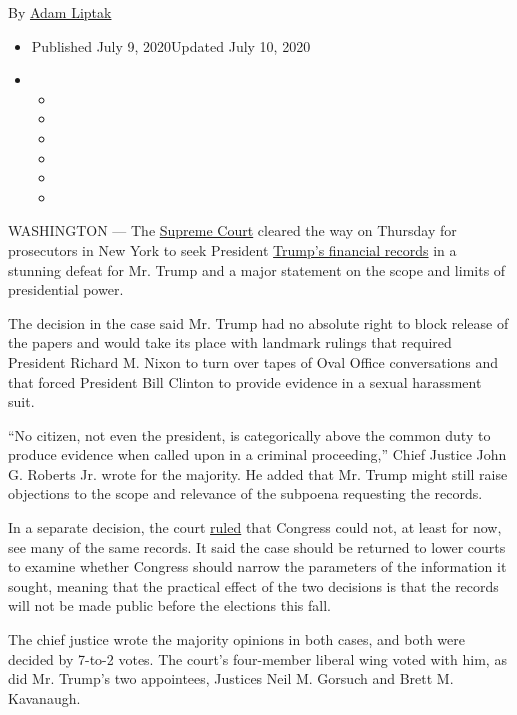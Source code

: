 By \href{https://www.nytimes3xbfgragh.onion/by/adam-liptak}{Adam Liptak}

\begin{itemize}
\item
  Published July 9, 2020Updated July 10, 2020
\item
  \begin{itemize}
  \item
  \item
  \item
  \item
  \item
  \item
  \end{itemize}
\end{itemize}

WASHINGTON --- The
\href{https://www.nytimes3xbfgragh.onion/2020/07/10/podcasts/the-daily/supreme-court-trump-taxes.html?action=click\&module=Briefings\&pgtype=Homepage}{Supreme
Court} cleared the way on Thursday for prosecutors in New York to seek
President
\href{https://www.nytimes3xbfgragh.onion/2020/07/10/nyregion/donald-trump-taxes-cy-vance.html}{Trump's
financial records} in a stunning defeat for Mr. Trump and a major
statement on the scope and limits of presidential power.

The decision in the case said Mr. Trump had no absolute right to block
release of the papers and would take its place with landmark rulings
that required President Richard M. Nixon to turn over tapes of Oval
Office conversations and that forced President Bill Clinton to provide
evidence in a sexual harassment suit.

``No citizen, not even the president, is categorically above the common
duty to produce evidence when called upon in a criminal proceeding,''
Chief Justice John G. Roberts Jr. wrote for the majority. He added that
Mr. Trump might still raise objections to the scope and relevance of the
subpoena requesting the records.

In a separate decision, the court
\href{https://www.supremecourt.gov/opinions/19pdf/19-715_febh.pdf}{ruled}
that Congress could not, at least for now, see many of the same records.
It said the case should be returned to lower courts to examine whether
Congress should narrow the parameters of the information it sought,
meaning that the practical effect of the two decisions is that the
records will not be made public before the elections this fall.

The chief justice wrote the majority opinions in both cases, and both
were decided by 7-to-2 votes. The court's four-member liberal wing voted
with him, as did Mr. Trump's two appointees, Justices Neil M. Gorsuch
and Brett M. Kavanaugh.

